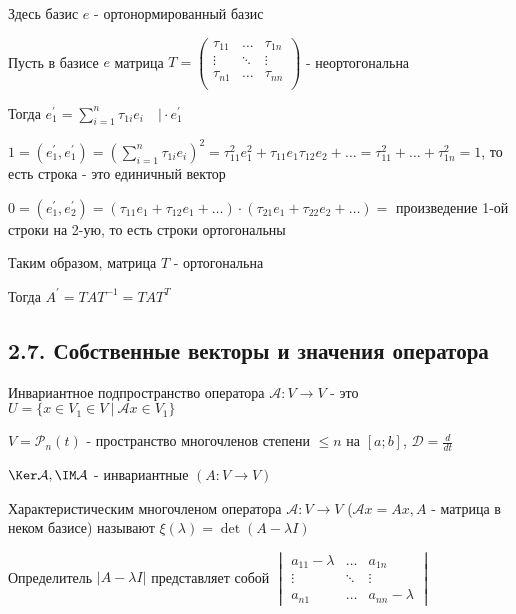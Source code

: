 \documentclass[12pt]{article}
\begin{document}
    Здесь базис $e$ - ортонормированный базис

    \begin{MyProof}
        Пусть в базисе $e$ матрица $T = \begin{pmatrix}
            \tau_{11} & \dots & \tau_{1n} \\
            \vdots & \ddots & \vdots \\
            \tau_{n1} & \dots & \tau_{nn} \\
        \end{pmatrix}$ - неортогональна

        Тогда $e_1^\prime = \sum_{i=1}^n \tau_{1i} e_i \quad \Big| \cdot e_1^\prime$

        $1 = (e_1^\prime, e_1^\prime) = \left(\sum_{i=1}^n \tau_{1i} e_i\right)^2 =
        \tau^2_{11} e^2_1 + \tau_{11} e_1 \tau_{12} e_2 + \dots = \tau_{11}^2 + \dots + \tau_{1n}^2 = 1$, то есть строка - это единичный вектор

        $0 = (e_1^\prime, e_2^\prime) = (\tau_{11} e_1 + \tau_{12}e_1 + \dots) \cdot
        (\tau_{21}e_1 + \tau_{22}e_2 + \dots) = $ произведение 1-ой строки на 2-ую, то есть строки ортогональны

        Таким образом, матрица $T$ - ортогональна
    \end{MyProof}

    \Nota Тогда $A^\prime = T A T^{-1} = T A T^T$


    \subsection{2.7. Собственные векторы и значения оператора}

    \Def Инвариантное подпространство оператора $\mathcal{A} : V \rightarrow V$ -
    это $U = \{x \in V_1 \in V \ | \ \mathcal{A}x \in V_1\}$

    \Ex $V = \mathcal{P}_n(t)$ - пространство многочленов степени $\leq n$ на $[a; b]$, $\mathcal{D} = \frac{d}{dt}$

    \Nota $\Ker \mathcal{A}, \IM \mathcal{A}$ - инвариантные $(A : V \rightarrow V)$

    \hypertarget{eigenvalue}{}

    \Def Характеристическим многочленом оператора $\mathcal{A} : V \rightarrow V$
    ($\mathcal{A}x = Ax, A$ - матрица в неком базисе) называют $\xi(\lambda) = \det(A - \lambda I)$

    \Nota Определитель $|A - \lambda I|$ представляет собой $\begin{vmatrix}a_{11} - \lambda & \dots & a_{1n} \\ \vdots & \ddots & \vdots \\ a_{n1} & \dots & a_{nn} - \lambda \end{vmatrix}$
\end{document}
